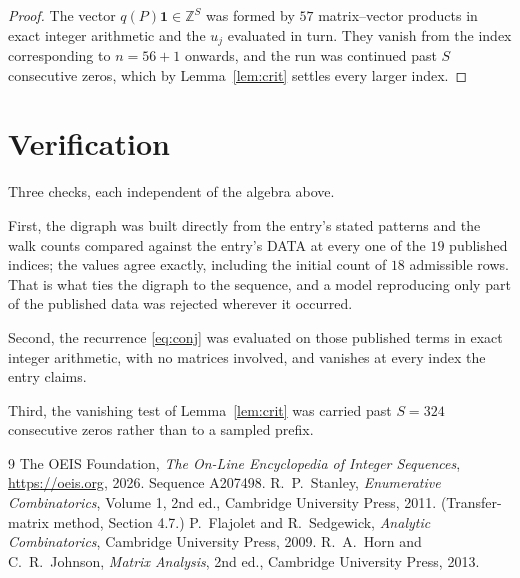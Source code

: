\documentclass[11pt,a4paper]{article}
\theoremstyle{plain}
\theoremstyle{definition}
\begin{document}
\begin{proof}
The vector $q(P)\mathbf{1}\in\mathbb{Z}^{S}$ was formed by $57$ matrix--vector
products in exact integer arithmetic and the $u_j$ evaluated in turn. They vanish from the
index corresponding to $n=56+1$ onwards, and the run was continued past $S$ consecutive
zeros, which by Lemma~\ref{lem:crit} settles every larger index.
\end{proof}

\section{Verification}

Three checks, each independent of the algebra above.

First, the digraph was built directly from the entry's stated patterns and the walk counts
compared against the entry's DATA at every one of the $19$ published indices; the
values agree exactly, including the initial count of $18$ admissible rows. That is
what ties the digraph to the sequence, and a model reproducing only part of the published
data was rejected wherever it occurred.

Second, the recurrence \eqref{eq:conj} was evaluated on those published terms in exact
integer arithmetic, with no matrices involved, and vanishes at every index the entry claims.

Third, the vanishing test of Lemma~\ref{lem:crit} was carried past $S=324$ consecutive
zeros rather than to a sampled prefix.

\begin{thebibliography}{9}
 The OEIS Foundation, \emph{The On-Line Encyclopedia of Integer
Sequences}, \url{https://oeis.org}, 2026. Sequence A207498.
 R.~P.~Stanley, \emph{Enumerative Combinatorics}, Volume 1, 2nd ed.,
Cambridge University Press, 2011. (Transfer-matrix method, Section 4.7.)
 P.~Flajolet and R.~Sedgewick, \emph{Analytic Combinatorics}, Cambridge
University Press, 2009.
 R.~A.~Horn and C.~R.~Johnson, \emph{Matrix Analysis}, 2nd ed., Cambridge
University Press, 2013.
\end{thebibliography}
\end{document}
